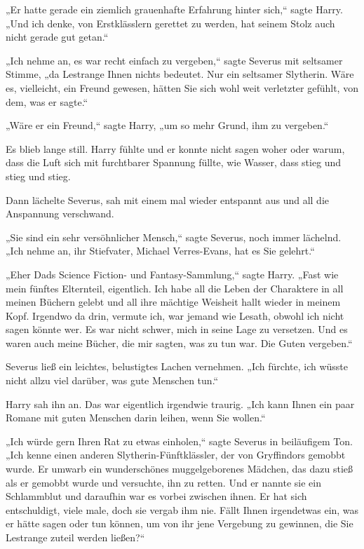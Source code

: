 {„Er hatte gerade ein ziemlich grauenhafte Erfahrung hinter sich,“ sagte Harry. „Und ich denke, von Erstklässlern gerettet zu werden, hat seinem Stolz auch nicht gerade gut getan.“

„Ich nehme an, es war recht einfach zu vergeben,“ sagte Severus mit seltsamer Stimme, „da Lestrange Ihnen nichts bedeutet. Nur ein seltsamer Slytherin. Wäre es, vielleicht, ein Freund gewesen, hätten Sie sich wohl weit verletzter gefühlt, von dem, was er sagte.“

„Wäre er ein Freund,“ sagte Harry, „um so mehr Grund, ihm zu vergeben.“

Es blieb lange still. Harry fühlte und er konnte nicht sagen woher oder warum, dass die Luft sich mit furchtbarer Spannung füllte, wie Wasser, dass stieg und stieg und stieg.

Dann lächelte Severus, sah mit einem mal wieder entspannt aus und all die Anspannung verschwand.

„Sie sind ein sehr versöhnlicher Mensch,“ sagte Severus, noch immer lächelnd. „Ich nehme an, ihr Stiefvater, Michael Verres-Evans, hat es Sie gelehrt.“

„Eher Dads Science Fiction- und Fantasy-Sammlung,“ sagte Harry. „Fast wie mein fünftes Elternteil, eigentlich. Ich habe all die Leben der Charaktere in all meinen Büchern gelebt und all ihre mächtige Weisheit hallt wieder in meinem Kopf. Irgendwo da drin, vermute ich, war jemand wie Lesath, obwohl ich nicht sagen könnte wer. Es war nicht schwer, mich in seine Lage zu versetzen. Und es waren auch meine Bücher, die mir sagten, was zu tun war. Die Guten vergeben.“

Severus ließ ein leichtes, belustigtes Lachen vernehmen. „Ich fürchte, ich wüsste nicht allzu viel darüber, was gute Menschen tun.“

Harry sah ihn an. Das war eigentlich irgendwie traurig. „Ich kann Ihnen ein paar Romane mit guten Menschen darin leihen, wenn Sie wollen.“

„Ich würde gern Ihren Rat zu etwas einholen,“ sagte Severus in beiläufigem Ton. „Ich kenne einen anderen Slytherin-Fünftklässler, der von Gryffindors gemobbt wurde. Er umwarb ein wunderschönes muggelgeborenes Mädchen, das dazu stieß als er gemobbt wurde und versuchte, ihn zu retten. Und er nannte sie ein Schlammblut und daraufhin war es vorbei zwischen ihnen. Er hat sich entschuldigt, viele male, doch sie vergab ihm nie. Fällt Ihnen irgendetwas ein, was er hätte sagen oder tun können, um von ihr jene Vergebung zu gewinnen, die Sie Lestrange zuteil werden ließen?“

}

